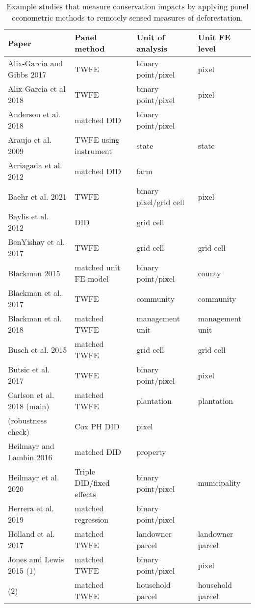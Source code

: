 \begin{table}[H]

\caption{\label{tab:table-lit}Example studies that measure conservation impacts by applying panel econometric methods to remotely sensed measures of deforestation.}
\fontsize{10}{12}\selectfont
\begin{tabular}[t]{llll}
\toprule
\textbf{Paper} & \textbf{Panel method} & \textbf{Unit of analysis} & \textbf{Unit FE level}\\
\midrule
Alix-Garcia and Gibbs 2017 & TWFE & binary point/pixel & pixel\\
Alix-Garcia et al 2018 & TWFE & binary point/pixel & pixel\\
Anderson et al. 2018 & matched DID & binary point/pixel & \\
Araujo et al. 2009 & TWFE using instrument & state & state\\
Arriagada et al. 2012 & matched DID & farm & \\
Baehr et al. 2021 & TWFE & binary pixel/grid cell & pixel\\
Baylis et al. 2012 & DID & grid cell & \\
BenYishay et al. 2017 & TWFE & grid cell & grid cell\\
Blackman 2015 & matched unit FE model & binary point/pixel & county\\
Blackman et al. 2017 & TWFE & community & community\\
Blackman et al. 2018 & matched TWFE & management unit & management unit\\
Busch et al. 2015 & matched TWFE & grid cell & grid cell\\
Butsic et al. 2017 & TWFE & binary point/pixel & pixel\\
Carlson et al. 2018 (main) & matched TWFE & plantation & plantation\\
(robustness check) & Cox PH DID & pixel & \\
Heilmayr and Lambin 2016 & matched DID & property & \\
Heilmayr et al. 2020 & Triple DID/fixed effects & binary point/pixel & municipality\\
Herrera et al. 2019 & matched regression & binary point/pixel & \\
Holland et al. 2017 & matched TWFE & landowner parcel & landowner parcel\\
Jones and Lewis 2015 (1) & matched TWFE & binary point/pixel & pixel\\
(2) & matched TWFE & household parcel & household parcel\\

\end{tabular}
\end{table}
